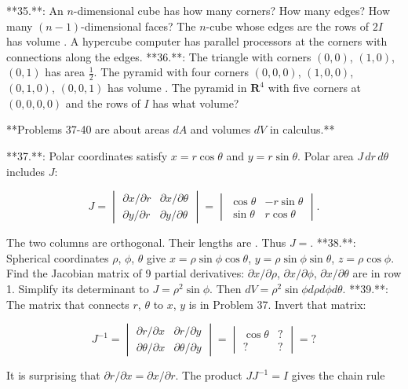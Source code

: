 

**35.**: An \(n\)-dimensional cube has how many corners? How many edges? How many \((n-1)\)-dimensional faces? The \(n\)-cube whose edges are the rows of \(2I\) has volume . A hypercube computer has parallel processors at the corners with connections along the edges.
**36.**: The triangle with corners \((0,0)\), \((1,0)\), \((0,1)\) has area \(\frac{1}{2}\). The pyramid with four corners \((0,0,0)\), \((1,0,0)\), \((0,1,0)\), \((0,0,1)\) has volume . The pyramid in \(\mathbf{R}^{4}\) with five corners at \((0,0,0,0)\) and the rows of \(I\) has what volume?

**Problems 37-40 are about areas \(dA\) and volumes \(dV\) in calculus.**

**37.**: Polar coordinates satisfy \(x=r\cos\theta\) and \(y=r\sin\theta\). Polar area \(J\,dr\,d\theta\) includes \(J\):

\[J=\begin{vmatrix}\partial x/\partial r&\partial x/\partial\theta\\ \partial y/\partial r&\partial y/\partial\theta\end{vmatrix}=\begin{vmatrix} \cos\theta&-r\sin\theta\\ \sin\theta&r\cos\theta\end{vmatrix}.\]

The two columns are orthogonal. Their lengths are . Thus \(J=\).
**38.**: Spherical coordinates \(\rho\), \(\phi\), \(\theta\) give \(x=\rho\sin\phi\cos\theta\), \(y=\rho\sin\phi\sin\theta\), \(z=\rho\cos\phi\). Find the Jacobian matrix of 9 partial derivatives: \(\partial x/\partial\rho\), \(\partial x/\partial\phi\), \(\partial x/\partial\theta\) are in row 1. Simplify its determinant to \(J=\rho^{2}\sin\phi\). Then \(dV=\rho^{2}\sin\phi\)\(d\rho\)\(d\phi\)\(d\theta\).
**39.**: The matrix that connects \(r\), \(\theta\) to \(x\), \(y\) is in Problem 37. Invert that matrix:

\[J^{-1}=\begin{vmatrix}\partial r/\partial x&\partial r/\partial y\\ \partial\theta/\partial x&\partial\theta/\partial y\end{vmatrix}=\begin{vmatrix} \cos\theta&?\\ ?&?\end{vmatrix}=?\]

It is surprising that \(\partial r/\partial x=\partial x/\partial r\). The product \(JJ^{-1}=I\) gives the chain rule

